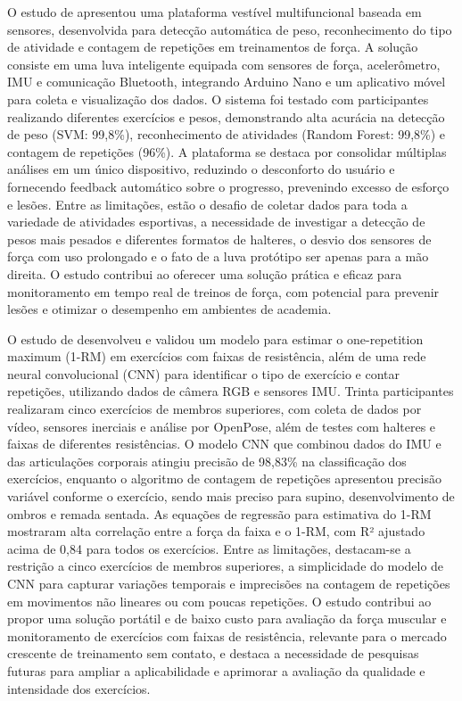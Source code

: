 O estudo de  apresentou uma plataforma vestível multifuncional baseada em sensores, desenvolvida para detecção automática de peso, reconhecimento do tipo de atividade e contagem de repetições em treinamentos de força. A solução consiste em uma luva inteligente equipada com sensores de força, acelerômetro, IMU e comunicação Bluetooth, integrando Arduino Nano e um aplicativo móvel para coleta e visualização dos dados. O sistema foi testado com participantes realizando diferentes exercícios e pesos, demonstrando alta acurácia na detecção de peso (SVM: 99,8\%), reconhecimento de atividades (Random Forest: 99,8\%) e contagem de repetições (96\%). A plataforma se destaca por consolidar múltiplas análises em um único dispositivo, reduzindo o desconforto do usuário e fornecendo feedback automático sobre o progresso, prevenindo excesso de esforço e lesões. Entre as limitações, estão o desafio de coletar dados para toda a variedade de atividades esportivas, a necessidade de investigar a detecção de pesos mais pesados e diferentes formatos de halteres, o desvio dos sensores de força com uso prolongado e o fato de a luva protótipo ser apenas para a mão direita. O estudo contribui ao oferecer uma solução prática e eficaz para monitoramento em tempo real de treinos de força, com potencial para prevenir lesões e otimizar o desempenho em ambientes de academia.

O estudo de  desenvolveu e validou um modelo para estimar o one-repetition maximum (1-RM) em exercícios com faixas de resistência, além de uma rede neural convolucional (CNN) para identificar o tipo de exercício e contar repetições, utilizando dados de câmera RGB e sensores IMU. Trinta participantes realizaram cinco exercícios de membros superiores, com coleta de dados por vídeo, sensores inerciais e análise por OpenPose, além de testes com halteres e faixas de diferentes resistências. O modelo CNN que combinou dados do IMU e das articulações corporais atingiu precisão de 98,83\% na classificação dos exercícios, enquanto o algoritmo de contagem de repetições apresentou precisão variável conforme o exercício, sendo mais preciso para supino, desenvolvimento de ombros e remada sentada. As equações de regressão para estimativa do 1-RM mostraram alta correlação entre a força da faixa e o 1-RM, com R² ajustado acima de 0,84 para todos os exercícios. Entre as limitações, destacam-se a restrição a cinco exercícios de membros superiores, a simplicidade do modelo de CNN para capturar variações temporais e imprecisões na contagem de repetições em movimentos não lineares ou com poucas repetições. O estudo contribui ao propor uma solução portátil e de baixo custo para avaliação da força muscular e monitoramento de exercícios com faixas de resistência, relevante para o mercado crescente de treinamento sem contato, e destaca a necessidade de pesquisas futuras para ampliar a aplicabilidade e aprimorar a avaliação da qualidade e intensidade dos exercícios.

